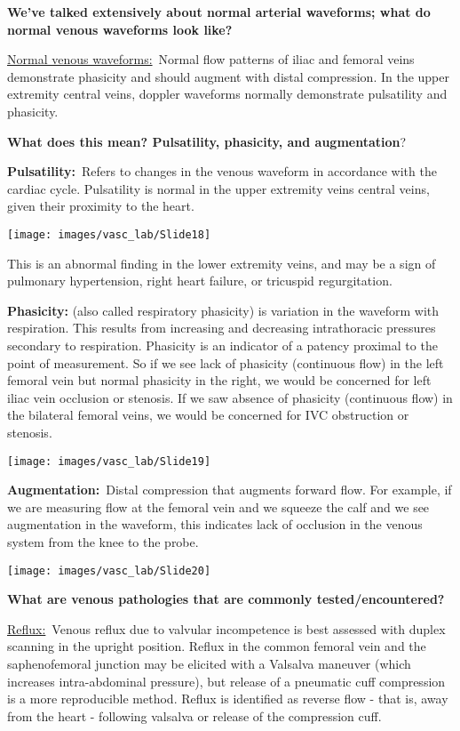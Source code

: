 \documentclass[
]{book}
\begin{document}
\textbf{We've talked extensively about normal arterial waveforms; what do
normal venous waveforms look like?}

\uline{Normal venous waveforms:}~Normal flow patterns of iliac and
femoral veins demonstrate phasicity and should augment with distal
compression. In the upper extremity central veins, doppler waveforms
normally demonstrate pulsatility and phasicity.

\textbf{What does this mean? Pulsatility, phasicity, and augmentation}?

\textbf{Pulsatility:}~Refers to changes in the venous waveform in accordance
with the cardiac cycle. Pulsatility is normal in the upper extremity
veins central veins, given their proximity to the heart.

\texttt{[image: images/vasc\_lab/Slide18]}

This is an abnormal finding in the lower extremity veins, and may be a
sign of pulmonary hypertension, right heart failure, or tricuspid
regurgitation.

\textbf{Phasicity:} (also called respiratory phasicity) is variation in the
waveform with respiration. This results from increasing and decreasing
intrathoracic pressures secondary to respiration. Phasicity is an
indicator of a patency proximal to the point of measurement. So if we
see lack of phasicity (continuous flow) in the left femoral vein but
normal phasicity in the right, we would be concerned for left iliac vein
occlusion or stenosis. If we saw absence of phasicity (continuous flow)
in the bilateral femoral veins, we would be concerned for IVC
obstruction or stenosis.

\texttt{[image: images/vasc\_lab/Slide19]}

\textbf{Augmentation:}~Distal compression that augments forward flow. For
example, if we are measuring flow at the femoral vein and we squeeze the
calf and we see augmentation in the waveform, this indicates lack of
occlusion in the venous system from the knee to the probe.

\texttt{[image: images/vasc\_lab/Slide20]}

\textbf{What are venous pathologies that are commonly tested/encountered?}

\uline{Reflux:}~Venous reflux due to valvular incompetence is best
assessed with duplex scanning in the upright position. Reflux in the
common femoral vein and the saphenofemoral junction may be elicited with
a Valsalva maneuver (which increases intra-abdominal pressure), but
release of a pneumatic cuff compression is a more reproducible method.
Reflux is identified as reverse flow - that is, away from the heart -
following valsalva or release of the compression cuff.
\end{document}
